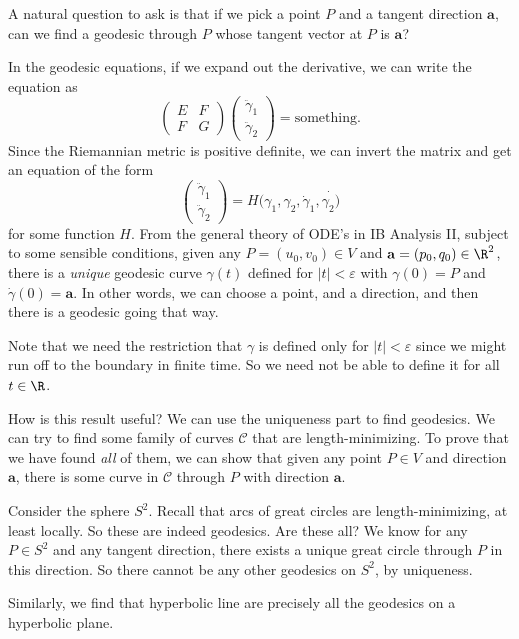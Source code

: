 \documentclass[a4paper]{article}
\begin{document}
A natural question to ask is that if we pick a point $P$ and a tangent direction $\mathbf{a}$, can we find a geodesic through $P$ whose tangent vector at $P$ is $\mathbf{a}$?

In the geodesic equations, if we expand out the derivative, we can write the equation as
\[
  \begin{pmatrix}
    E & F\\
    F & G
  \end{pmatrix}
  \begin{pmatrix}
    \ddot{\gamma}_1\\
    \ddot{\gamma}_2
  \end{pmatrix} = \text{something}.
\]
Since the Riemannian metric is positive definite, we can invert the matrix and get an equation of the form
\[
  \begin{pmatrix}
    \ddot{\gamma}_1\\ \ddot{\gamma}_2
  \end{pmatrix} =
  H(\gamma_1, \gamma_2, \dot{\gamma}_1, \dot{\gamma_2)}
\]
for some function $H$. From the general theory of ODE's in IB Analysis II, subject to some sensible conditions, given any $P = (u_0, v_0) \in V$ and $\mathbf{a} = (p_0, q_0) \in \R^2$, there is a \emph{unique} geodesic curve $\gamma(t)$ defined for $|t| < \varepsilon$ with $\gamma(0) = P$ and $\dot{\gamma}(0) = \mathbf{a}$. In other words, we can choose a point, and a direction, and then there is a geodesic going that way.

Note that we need the restriction that $\gamma$ is defined only for $|t| < \varepsilon$ since we might run off to the boundary in finite time. So we need not be able to define it for all $t \in \R$.

How is this result useful? We can use the uniqueness part to find geodesics. We can try to find some family of curves $\mathcal{C}$ that are length-minimizing. To prove that we have found \emph{all} of them, we can show that given any point $P \in V$ and direction $\mathbf{a}$, there is some curve in $\mathcal{C}$ through $P$ with direction $\mathbf{a}$.

\begin{eg}
  Consider the sphere $S^2$. Recall that arcs of great circles are length-minimizing, at least locally. So these are indeed geodesics. Are these all? We know for any $P \in S^2$ and any tangent direction, there exists a unique great circle through $P$ in this direction. So there cannot be any other geodesics on $S^2$, by uniqueness.

  Similarly, we find that hyperbolic line are precisely all the geodesics on a hyperbolic plane.
\end{eg}
\end{document}
